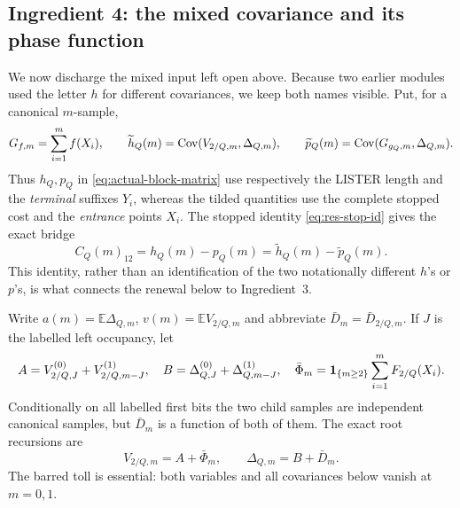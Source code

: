 \documentclass[11pt]{article}
\numberwithin{equation}{section}
\newcommand{\E}{\mathbb E}\newcommand{\Pp}{\mathbb P}
\newcommand{\1}{\mathbf 1}\newcommand{\F}{\mathcal F}\newcommand{\D}{\mathcal D}
\begin{document}
\subsection{Ingredient 4: the mixed covariance and its phase function}
\label{sec:mixed-kappa-d}
We now discharge the mixed input left open above.  Because two earlier modules
used the letter $h$ for different covariances, we keep both names visible.
Put, for a canonical $m$-sample,
\[
 G_{f,m}=\sum_{i=1}^m f(X_i),\qquad
 \widetilde h_Q(m)=\operatorname{Cov}(V_{2/Q,m},\Delta_{Q,m}),\qquad
 \widetilde p_Q(m)=\operatorname{Cov}(G_{g_Q,m},\Delta_{Q,m}).
\]
Thus $h_Q,p_Q$ in \eqref{eq:actual-block-matrix} use respectively the
LISTER length and the \emph{terminal} suffixes $Y_i$, whereas the tilded
quantities use the complete stopped cost and the \emph{entrance} points
$X_i$.  The stopped identity \eqref{eq:res-stop-id} gives the exact bridge
\begin{equation}
 C_Q(m)_{12}=h_Q(m)-p_Q(m)
 =\widetilde h_Q(m)-\widetilde p_Q(m).                 \label{eq:mixed-bridge-d}
\end{equation}
This identity, rather than an identification of the two notationally
different $h$'s or $p$'s, is what connects the renewal below to Ingredient~3.

Write $a(m)=\E\Delta_{Q,m}$, $v(m)=\E V_{2/Q,m}$ and abbreviate
$\bar D_m=\bar D_{2/Q,m}$.  If $J$ is the labelled left occupancy, let
\[
 A=V_{2/Q,J}^{(0)}+V_{2/Q,m-J}^{(1)},\quad
 B=\Delta_{Q,J}^{(0)}+\Delta_{Q,m-J}^{(1)},\quad
 \bar\Phi_m={\bf1}_{\{m\ge2\}}\sum_{i=1}^mF_{2/Q}(X_i).
\]
Conditionally on all labelled first bits the two child samples are independent
canonical samples, but $\bar D_m$ is a function of both of them.  The exact
root recursions are
\[
 V_{2/Q,m}=A+\bar\Phi_m,
 \qquad \Delta_{Q,m}=B+\bar D_m.                       \label{eq:mixed-root-d}
\]
The barred toll is essential: both variables and all covariances below vanish
at $m=0,1$.
\end{document}
